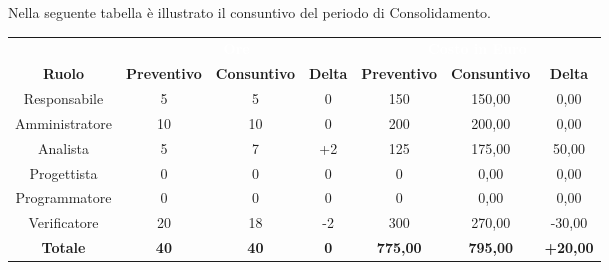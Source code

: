 Nella seguente tabella è illustrato il consuntivo del periodo di Consolidamento.

\begin{tabular}{c|ccc|ccc}
\rowcolor{greySWEight}
\multicolumn{1}{c}{} & \multicolumn{3}{c}{\textcolor{white}{\textbf{Ore}}} & \multicolumn{3}{c}{\textcolor{white}{\textbf{Costo in Euro}}} \\
{\textbf{Ruolo}} & {\textbf{Preventivo}} & {\textbf{Consuntivo}} & {\textbf{Delta}} & {\textbf{Preventivo}} & {\textbf{Consuntivo}} & {\textbf{Delta}} \\
Responsabile & 5 & 5 & 0 & 150 & 150,00 & 0,00 \\
Amministratore & 10 & 10 & 0 & 200 & 200,00 & 0,00 \\
Analista & 5 & 7 & +2 & 125 & 175,00 & 50,00 \\
Progettista & 0 & 0 & 0 & 0 & 0,00 & 0,00 \\
Programmatore & 0 & 0 & 0 & 0 & 0,00 & 0,00 \\
Verificatore & 20 & 18 & -2 & 300 & 270,00 & -30,00 \\
\hline
\textbf{Totale} & \textbf{40} & \textbf{40} & \textbf{0} & \textbf{775,00} & \textbf{795,00} & \textbf{+20,00} \\
\end{tabular}
